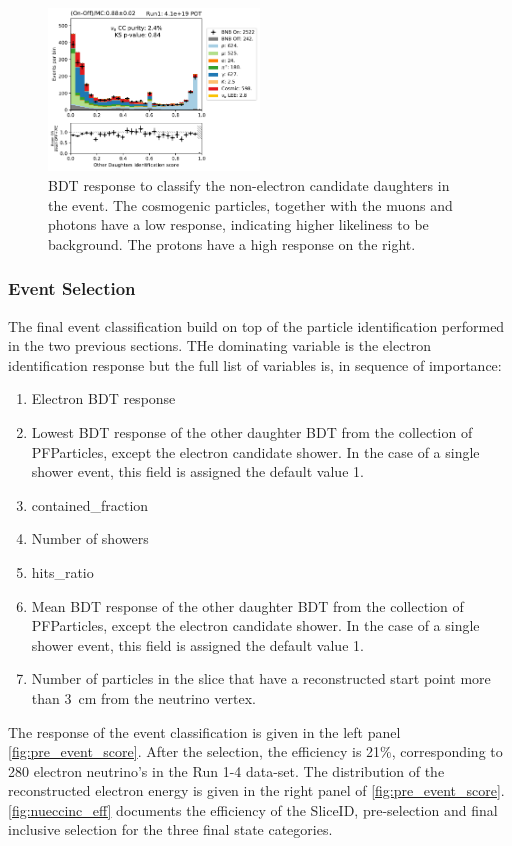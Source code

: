 \begin{figure}
    \centering
    \includegraphics[width=0.5\textwidth]{NueCCsel/Images/run1/pre_daughter_score.pdf}
    \caption{BDT response to classify the non-electron candidate daughters in the event. The cosmogenic particles, together with the muons and photons have a low response, indicating higher likeliness to be background. The protons have a high response on the right.}
    \label{fig:pre_daughter_score}
\end{figure}

\subsubsection{Event Selection}
The final event classification build on top of the particle identification performed in the two previous sections. THe dominating variable is the electron identification response but the full list of variables is, in sequence of importance:

\begin{enumerate}
    \item Electron BDT response
    \item Lowest BDT response of the other daughter BDT from the collection of PFParticles, except the electron candidate shower. In the case of a single shower event, this field is assigned the default value 1. 
    \item contained\_fraction
    \item Number of showers
    \item hits\_ratio
    \item Mean BDT response of the other daughter BDT from the collection of PFParticles, except the electron candidate shower. In the case of a single shower event, this field is assigned the default value 1. 
    \item Number of particles in the slice that have a reconstructed start point more than \SI{3}{\cm} from the neutrino vertex.
\end{enumerate}
The response of the event classification is given in the left panel \cref{fig:pre_event_score}. After the selection, the efficiency is 21\%, corresponding to 280 electron neutrino's in the Run 1-4 data-set. The distribution of the reconstructed electron energy is given in the right panel of \cref{fig:pre_event_score}. \cref{fig:nueccinc_eff} documents the efficiency of the SliceID, pre-selection and final inclusive selection for the three final state categories.

